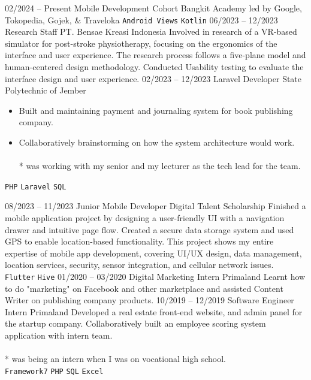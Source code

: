 \documentclass[9pt]{developercv} %
\begin{document}
\begin{entrylist}
	\entry
	{02/2024 -- Present}
	{Mobile Development Cohort}
	{Bangkit Academy led by Google, Tokopedia, Gojek, \& Traveloka}
	{ 
	\texttt{Android Views} \slashsep \texttt{Kotlin} }
	\entry
	{06/2023 -- 12/2023}
	{Research Staff}
	{PT. Bensae Kreasi Indonesia}
	{Involved in research of a VR-based simulator for post-stroke physiotherapy, focusing on the ergonomics of the interface and user experience. The research process follows a five-plane model and human-centered design methodology. Conducted Usability testing to evaluate the interface design and user experience.}
	\entry
	{02/2023 -- 12/2023}
	{Laravel Developer}
	{State Polytechnic of Jember}
	{\vspace{-10pt}
		\begin{itemize}[noitemsep,topsep=0pt,parsep=0pt,partopsep=0pt, leftmargin=-1pt]
			\item {Built and maintaining payment and journaling system for book publishing company.}
			\item {Collaboratively brainstorming on how the system architecture would work.}
			      \vspace{-7 pt}
			      \\ \\
			      {* was working with my senior and my lecturer as the tech lead for the team.}
		\end{itemize}
		\texttt{PHP} \slashsep \texttt{Laravel} \slashsep \texttt{SQL} }
	\entry
	{08/2023 -- 11/2023}
	{Junior Mobile Developer}
	{Digital Talent Scholarship}
	{Finished a mobile application project by designing a user-friendly UI with a navigation drawer and intuitive page flow. Created a secure data storage system and used GPS to enable location-based functionality. This project shows my entire expertise of mobile app development, covering UI/UX design, data management, location services, security, sensor integration, and cellular network issues.
		\\
		\texttt{Flutter} \slashsep \texttt{Hive} }
	\entry
	{01/2020 -- 03/2020}
	{Digital Marketing Intern}
	{Primaland}
	{Learnt how to do "marketing" on Facebook and other marketplace and assisted Content Writer on publishing company products.}
	\entry
	{10/2019 -- 12/2019}
	{Software Engineer Intern}
	{Primaland}
	{{Developed a real estate front-end website, and admin panel for the startup company. Collaboratively built an employee scoring system application with intern team.}
	\vspace{-7 pt}
	\\ \\
	{* was being an intern when I was on vocational high school.}
	\\
	\texttt{Framework7} \slashsep \texttt{PHP} \slashsep \texttt{SQL} \slashsep \texttt{Excel}}
\end{entrylist}
\end{document}

